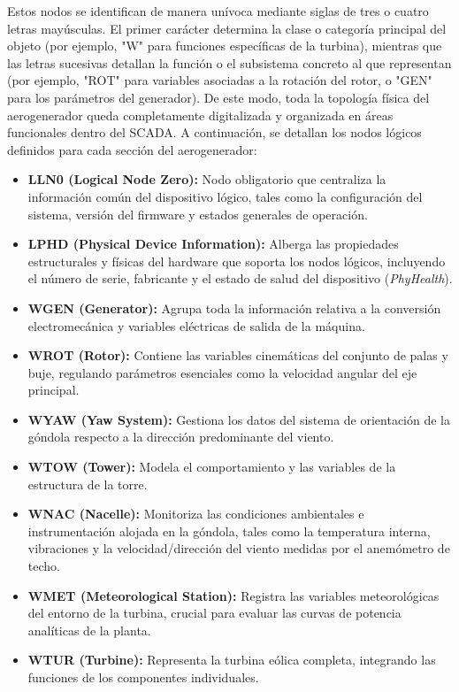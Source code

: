 Estos nodos se identifican de manera unívoca mediante siglas de tres o cuatro letras mayúsculas. El primer carácter determina la clase o categoría principal del objeto (por ejemplo, "W" para funciones específicas de la turbina), mientras que las letras sucesivas detallan la función o el subsistema concreto al que representan (por ejemplo, "ROT" para variables asociadas a la rotación del rotor, o "GEN" para los parámetros del generador). De este modo, toda la topología física del aerogenerador queda completamente digitalizada y organizada en áreas funcionales dentro del \ac{SCADA}. A continuación, se detallan los nodos lógicos definidos para cada sección del aerogenerador:
\begin{itemize}
    \item \textbf{LLN0 (Logical Node Zero):} Nodo obligatorio que centraliza la información común del dispositivo lógico, tales como la configuración del sistema, versión del firmware y estados generales de operación.
    \item \textbf{LPHD (Physical Device Information):} Alberga las propiedades estructurales y físicas del hardware que soporta los nodos lógicos, incluyendo el número de serie, fabricante y el estado de salud del dispositivo (\textit{PhyHealth}).
    \item \textbf{WGEN (Generator):} Agrupa toda la información relativa a la conversión electromecánica y variables eléctricas de salida de la máquina.
    \item \textbf{WROT (Rotor):} Contiene las variables cinemáticas del conjunto de palas y buje, regulando parámetros esenciales como la velocidad angular del eje principal.
    \item \textbf{WYAW (Yaw System):} Gestiona los datos del sistema de orientación de la góndola respecto a la dirección predominante del viento.
    \item \textbf{WTOW (Tower):} Modela el comportamiento y las variables de la estructura de la torre.
    \item \textbf{WNAC (Nacelle):} Monitoriza las condiciones ambientales e instrumentación alojada en la góndola, tales como la temperatura interna, vibraciones y la velocidad/dirección del viento medidas por el anemómetro de techo.
    \item \textbf{WMET (Meteorological Station):} Registra las variables meteorológicas del entorno de la turbina, crucial para evaluar las curvas de potencia analíticas de la planta.
    \item \textbf{WTUR (Turbine):} Representa la turbina eólica completa, integrando las funciones de los componentes individuales.
\end{itemize}


